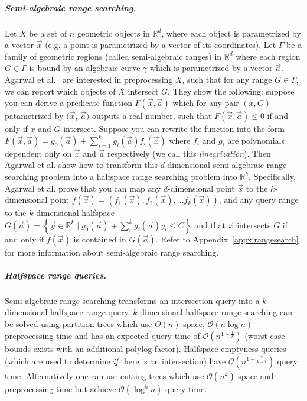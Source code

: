 \documentclass[UKenglish]{lipics-v2019}
\newcommand{\etal}{\textnormal{et al.}\xspace}
\begin{document}
\subparagraph{Semi-algebraic range searching.}
Let $X$ be a set of $n$ geometric objects in $\mathbb{R}^d$, where each object is parametrized by a vector $\vec{x}$ (e.g. a point is parametrized by a vector of its coordinates). Let $\Gamma$ be a family of geometric regions (called semi-algebraic ranges) in $\mathbb{R}^d$ where each region $G \in \Gamma$ is bound by an algebraic curve $\gamma$ which is parametrized by a vector $\vec{a}$. Agarwal \etal~\cite{agarwal2013range} are interested in preprocessing $X$, such that for any range $G \in \Gamma$, we can report which objects of $X$ intersect $G$. They show the following: suppose you can derive a predicate function $F(\vec{x}, \vec{a})$ which for any pair $(x,G)$ patametrized by $(\vec{x}$, $\vec{a})$ outputs a real number, such that $F(\vec{x}, \vec{a}) \le 0$ if and only if $x$ and $G$ intersect. Suppose you can rewrite the function into the form  $F(\vec{x}, \vec{a}) =  g_0(\vec{a}) + \sum_{i=1}^k g_i(\vec{a})f_i(\vec{x})$ where $f_i$ and $g_i$ are polynomials dependent only on $\vec{x}$ and $\vec{a}$ respectively (we call this \emph{linearization}). Then Agarwal \etal show how to transform this $d$-dimensional semi-algebraic range searching problem into a halfspace range searching problem into $\mathbb{R}^k$. Specifically, Agarwal \etal prove that you can map any $d$-dimensional point $\vec{x}$ to the $k$-dimensional point $f(\vec{x}) = (f_1(\vec{x}), f_2(\vec{x}), \dots f_k(\vec{x}))$, and any query range to the $k$-dimensional halfspace $G(\vec{a}) = \left\{ \vec{y} \in \mathbb{R}^k \mid g_0(\vec{a})  + \sum_i^k g_i(\vec{a})y_i  \le C \right\}$ and that $\vec{x}$ intersects $G$ if and only if $f(\vec{x})$ is contained in $G(\vec{a})$. Refer to Appendix~\ref{appx:rangesearch} for more information about semi-algebraic range searching.




\subparagraph{Halfspace range queries.}
Semi-algebraic range searching transforms an intersection query into a $k$-dimensional halfspace range query. $k$-dimensional halfspace range searching can be solved using partition trees \cite{chan2012optimal} which use $\Theta(n)$ space, $\mathcal{O}(n \log n)$ preprocessing time and has an expected query time of $\mathcal{O}(n^{1 - \frac{1}{k}})$ (worst-case bounds exists with an additional polylog factor). Halfspace emptyness queries (which are used to determine \emph{if} there is an intersection) have $\mathcal{O}(n^{1 - \frac{2}{k+1}})$ query time. Alternatively one can use cutting trees \cite{chazelle1993cutting} which use $\mathcal{O}(n^k)$ space and preprocessing time but achieve $\mathcal{O}(\log^k n)$ query time.
%
\end{document}
